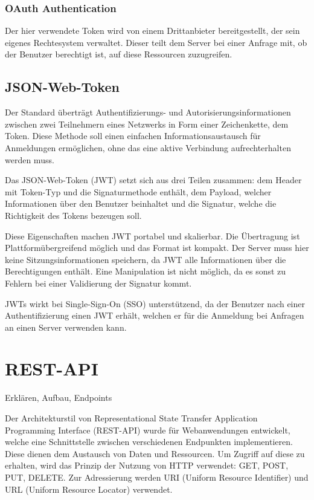 \subsection{OAuth Authentication}
Der hier verwendete Token wird von einem Drittanbieter bereitgestellt, der sein eigenes Rechtesystem verwaltet. Dieser teilt dem Server bei einer Anfrage mit, ob der Benutzer berechtigt ist, auf diese Ressourcen zuzugreifen.

\section{JSON-Web-Token}
Der Standard überträgt Authentifizierungs- und Autorisierungsinformationen zwischen zwei Teilnehmern eines Netzwerks in Form einer Zeichenkette, dem Token. Diese Methode soll einen einfachen Informationsaustausch für Anmeldungen ermöglichen, ohne das eine aktive Verbindung aufrechterhalten werden muss.

Das JSON-Web-Token (JWT) setzt sich aus drei Teilen zusammen: dem Header mit Token-Typ und die Signaturmethode enthält, dem Payload, welcher Informationen über den Benutzer beinhaltet und die Signatur, welche die Richtigkeit des Tokens bezeugen soll.

Diese Eigenschaften machen JWT portabel und skalierbar. Die Übertragung ist Plattformübergreifend möglich und das Format ist kompakt. Der Server muss hier keine Sitzungsinformationen speichern, da JWT alle Informationen über die Berechtigungen enthält. Eine Manipulation ist nicht möglich, da es sonst zu Fehlern bei einer Validierung der Signatur kommt.

JWTs wirkt bei Single-Sign-On (SSO) unterstützend, da der Benutzer nach einer Authentifizierung einen JWT erhält, welchen er für die Anmeldung bei Anfragen an einen Server verwenden kann.

\chapter{REST-API}
Erklären, Aufbau, Endpoints

Der Architekturstil von Representational State Transfer Application Programming Interface (REST-API) wurde für Webanwendungen entwickelt, welche eine Schnittstelle zwischen verschiedenen Endpunkten implementieren. Diese dienen dem Austausch von Daten und Ressourcen. Um Zugriff auf diese zu erhalten, wird das Prinzip der Nutzung von HTTP verwendet: GET, POST, PUT, DELETE. Zur Adressierung werden URI (Uniform Resource Identifier) und URL (Uniform Resource Locator) verwendet.

